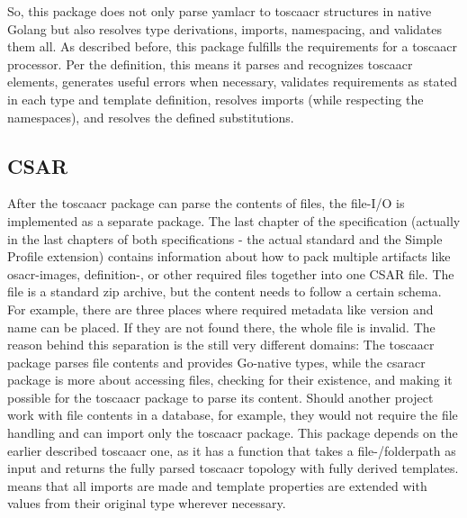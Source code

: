\newline
So, this package does not only parse \gls{yamlacr} to \gls{toscaacr} structures in native Golang but also resolves type derivations, imports, namespacing, and validates them all.
\newline
As described before, this package fulfills the requirements for a \gls{toscaacr} processor. Per the definition, this means it parses and recognizes \gls{toscaacr} elements, generates useful errors when necessary, validates requirements as stated in each type and template definition, resolves imports (while respecting the namespaces), and resolves the defined substitutions.


\subsection{CSAR}
After the \gls{toscaacr} package can parse the contents of files, the file-I/O is implemented as a separate package. The last chapter of the specification (actually in the last chapters of both specifications - the actual standard and the Simple Profile extension) contains information about how to pack multiple artifacts like \gls{osacr}-images, definition-, or other required files together into one CSAR file. The file is a standard zip archive, but the content needs to follow a certain schema. For example, there are three places where required metadata like version and name can be placed. If they are not found there, the whole file is invalid.
\newline
The reason behind this separation is the still very different domains: The \gls{toscaacr} package parses file contents and provides Go-native types, while the \gls{csaracr} package is more about accessing files, checking for their existence, and making it possible for the \gls{toscaacr} package to parse its content. Should another project work with file contents in a database, for example, they would not require the file handling and can import only the \gls{toscaacr} package.
\newline
This package depends on the earlier described \gls{toscaacr} one, as it has a function that takes a file-/folderpath as input and returns the fully parsed \gls{toscaacr} topology with fully derived templates.  means that all imports are made and template properties are extended with values from their original type wherever necessary.


